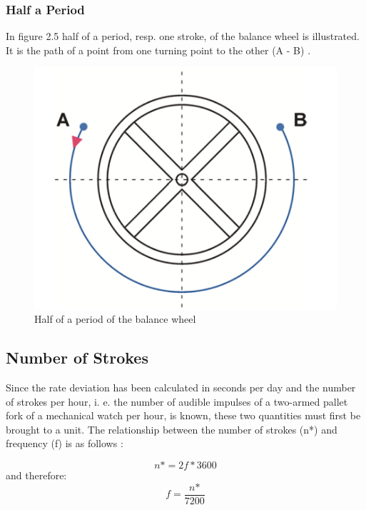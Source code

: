 \documentclass[12pt, a4paper]{report}
\begin{document}
\subsubsection{Half a Period}
In figure 2.5 half of a period, resp. one stroke, of the balance wheel is illustrated. It is the path of a point from one turning point to the other (A - B) \cite{Witschi_basics}.
    \begin{figure}[H]
    \centering
    \includegraphics[scale=0.4]{Images/Halfperiod.png}
    
    \caption{Half of a period of the balance wheel \cite{Witschi_basics}}
    \end{figure}
\bigskip
    
    \subsection{Number of Strokes}
    Since the rate deviation has been calculated in seconds per day and the number of strokes per hour, i. e. the number of audible impulses of a two-armed pallet fork of a mechanical watch per hour, is known, these two quantities must first be brought to a unit. The relationship between the number of strokes (n*) and frequency (f) is as follows \cite{Krug1987}: 
    
    \begin{displaymath}
    n\text{*} = 2f*3600
     \end{displaymath}
     and therefore:
     \begin{displaymath}
      f = \frac{n\text{*}}{7200}
     \end{displaymath}
     
\end{document}
